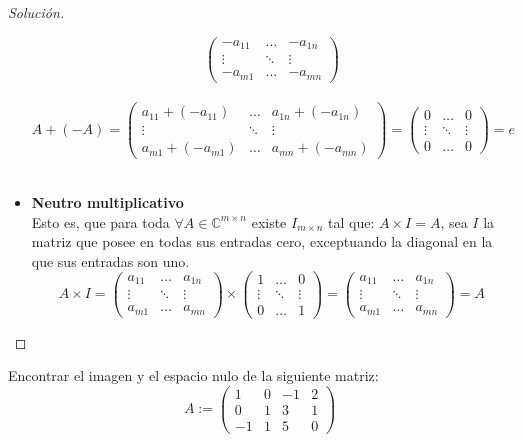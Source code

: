 \documentclass[12pt]{book}
\newcommand{\C}{\mathbb{C}}
\newenvironment{solucion}
  {\renewcommand\qedsymbol{$\square$}\begin{proof}[Solución]}
  {\end{proof}}
\begin{document}
\begin{solucion}
\begin{itemize}
\[\begin{pmatrix}
        -a_{11} & \dots & -a_{1n}\\
        \vdots & \ddots & \vdots\\
        -a_{m1} & \dots & -a_{mn}
        \end{pmatrix}\]\\
        \[A + (-A) = \begin{pmatrix}
        a_{11}+(-a_{11}) & \dots & a_{1n}+(-a_{1n})\\
        \vdots & \ddots & \vdots\\
        a_{m1}+(-a_{m1}) & \dots & a_{mn}+(-a_{mn})
        \end{pmatrix}
        =
        \begin{pmatrix}
        0 & \dots & 0\\
        \vdots & \ddots & \vdots\\
        0 & \dots & 0
        \end{pmatrix} = e\]\\
    \item \textbf{Neutro multiplicativo}\\
        Esto es, que para toda $\forall A \in \C^{m\times n}$ existe $I_{m\times n}$ tal que: $A\times I = A$, sea $I$ la matriz que posee en todas sus entradas cero, exceptuando la diagonal en la que sus entradas son uno. \\
        \[A\times I = \begin{pmatrix}
        a_{11} & \dots & a_{1n}\\
        \vdots & \ddots & \vdots\\
        a_{m1} & \dots & a_{mn}
        \end{pmatrix} \times \begin{pmatrix}
        1 & \dots & 0\\
        \vdots & \ddots & \vdots\\
        0 & \dots & 1
        \end{pmatrix}=\begin{pmatrix}
        a_{11} & \dots & a_{1n}\\
        \vdots & \ddots & \vdots\\
        a_{m1} & \dots & a_{mn}
        \end{pmatrix}=A\]
\end{itemize}

\end{solucion}
\eje Encontrar el imagen y el espacio nulo de la siguiente matriz:
    \[
    A:=\begin{pmatrix}
    1 & 0 & -1 & 2\\
    0 & 1 & 3 & 1\\
    -1 & 1 & 5 & 0
    \end{pmatrix}
    \]
\end{document}
